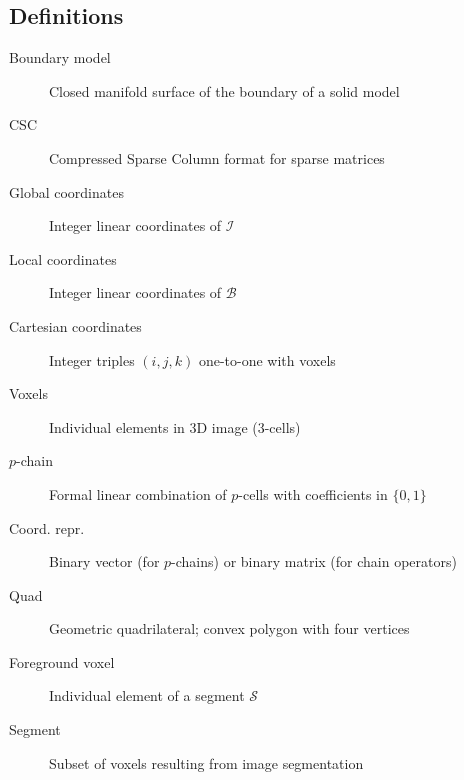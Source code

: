\documentclass[11pt, oneside]{article}   	%
\begin{document}
\subsection{Definitions}
\begin{description}

\item[Boundary model] Closed manifold surface of the boundary of a solid model
\\[-7mm]
\item[CSC]  Compressed Sparse Column format for sparse matrices
\\[-7mm]
\item[Global coordinates]  Integer linear coordinates of $\mathcal{I}$
\\[-7mm]
\item[Local coordinates] Integer linear coordinates of $\mathcal{B}$
\\[-7mm]
\item[Cartesian coordinates] Integer triples $(i,j,k)$ one-to-one with voxels 
\\[-7mm]
\item[Voxels] Individual elements in 3D image (3-cells)
\\[-7mm]
\item[$p$-chain] Formal linear combination of $p$-cells with coefficients in $\{0,1\}$
\\[-7mm]
\item[Coord. repr.]  Binary vector (for $p$-chains) or binary matrix (for chain operators)
\\[-7mm]
\item[Quad]	Geometric quadrilateral; convex polygon with four vertices 
\\[-7mm]
\item[Foreground voxel] Individual element of a segment $\mathcal{S}$
\\[-7mm]
\item[Segment]	Subset of voxels resulting from image segmentation
\end{description}



%

\end{document}
